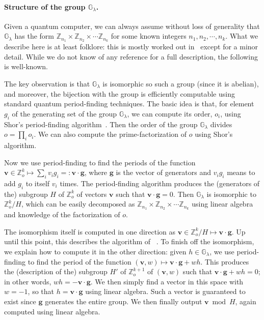 \documentclass{article}\usepackage[a4paper,margin=20mm]{geometry}
\numberwithin{theorem}{section}
\numberwithin{equation}{section}
\newcommand{\Z}{\mathbb{Z}}
\newcommand{\G}{\mathbb{G}}
\newcommand{\gv}{{\mathbf{g}}}
\providecommand{\vv}{}\renewcommand{\vv}{{\mathbf{v}}}
\begin{document}
\paragraph{Structure of the group $\G_\lambda$.} Given a quantum computer, we can always assume without loss of generality that $\G_\lambda$ has the form $\Z_{n_1}\times \Z_{n_2}\times\cdots\Z_{n_k}$ for some known integers $n_1,n_2,\cdots,n_k$. What we describe here is at least folklore: this is mostly worked out in~\cite{CheMos01} except for a minor detail. While we do not know of any reference for a full description, the following is well-known.

The key observation is that $\G_\lambda$ is isomorphic so such a group (since it is abelian), and moreover, the bijection with the group is efficiently computable using standard quantum period-finding techniques. The basic idea is that, for element $g_i$ of the generating set of the group $\G_\lambda$, we can compute its order, $o_i$, using Shor's period-finding algorithm~\cite{FOCS:Shor94}. Then the order of the group $\G_\lambda$ divides $o=\prod_i o_i$. We can also compute the prime-factorization of $o$ using Shor's algorithm. 

Now we use period-finding to find the periods of the function $\vv\in\Z_o^k\mapsto\sum_i v_i g_i =: \vv\cdot \gv$, where $\gv$ is the vector of generators and $v_i g_i$ means to add $g_i$ to itself $v_i$ times. The period-finding algorithm produces the (generators of the) subgroup $H$ of $\Z_o^k$ of vectors $\vv$ such that $\vv\cdot\gv=0$. Then $\G_\lambda$ is isomorphic to $\Z_o^k/H$, which can be easily decomposed as $\Z_{n_1}\times \Z_{n_2}\times\cdots\Z_{n_k}$ using linear algebra and knowledge of the factorization of $o$. 

The isomorphism itself is computed in one direction as $\vv\in \Z_o^k/H\mapsto \vv\cdot\gv$. Up until this point, this describes the algorithm of ~\cite{CheMos01}. To finish off the isomorphism, we explain how to compute it in the other direction: given $h\in\G_\lambda$, we use period-finding to find the period of the function $(\vv,w)\mapsto \vv\cdot\gv+w h$. This produces the (description of the) subgroup $H'$ of $\Z_o^{k+1}$ of $(\vv,w)$  such that $\vv\cdot\gv+w h=0$; in other words, $wh=-\vv\cdot\gv$. We then simply find a vector in this space with $w=-1$, so that $h=\vv\cdot \gv$ using linear algebra. Such a vector is guaranteed to exist since $\gv$ generates the entire group. We then finally output $\vv\bmod H$, again computed using linear algebra.
\end{document}
